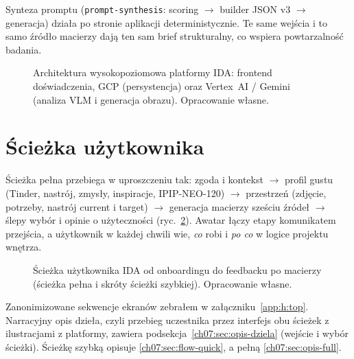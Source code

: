 Synteza promptu (\texttt{prompt-synthesis}: scoring $\rightarrow$ builder JSON v3 $\rightarrow$ generacja) działa po stronie aplikacji deterministycznie. Te same wejścia i to samo źródło macierzy dają ten sam brief strukturalny, co wspiera powtarzalność badania.

\begin{figure}[htbp]
  \centering
  \caption{Architektura wysokopoziomowa platformy IDA: frontend doświadczenia, GCP (persystencja) oraz Vertex~AI / Gemini (analiza VLM i generacja obrazu). Opracowanie własne.}
  \label{fig:ch07:architecture}
\end{figure}

\section{Ścieżka użytkownika}
\label{ch07:sec:flow}

Ścieżka pełna przebiega w uproszczeniu tak: zgoda i kontekst $\rightarrow$ profil gustu (Tinder, nastrój, zmysły, inspiracje, IPIP-NEO-120) $\rightarrow$ przestrzeń (zdjęcie, potrzeby, nastrój current i target) $\rightarrow$ generacja macierzy sześciu źródeł $\rightarrow$ ślepy wybór i opinie o użyteczności (ryc.~\ref{fig:ch07:flow}). Awatar łączy etapy komunikatem przejścia, a użytkownik w każdej chwili wie, \emph{co} robi i \emph{po co} w logice projektu wnętrza.

\begin{figure}[htbp]
  \centering
  \caption{Ścieżka użytkownika IDA od onboardingu do feedbacku po macierzy (ścieżka pełna i skróty ścieżki szybkiej). Opracowanie własne.}
  \label{fig:ch07:flow}
\end{figure}

Zanonimizowane sekwencje ekranów zebrałem w załączniku~\ref{app:h:top}. Narracyjny opis dzieła, czyli przebieg uczestnika przez interfejs obu ścieżek z ilustracjami z platformy, zawiera podsekcja~\ref{ch07:sec:opis-dziela} (wejście i wybór ścieżki). Ścieżkę szybką opisuje \ref{ch07:sec:flow-quick}, a pełną \ref{ch07:sec:opis-full}.

